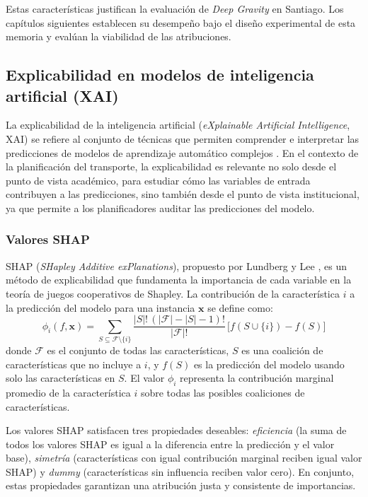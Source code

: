 Estas características justifican la evaluación de \textit{Deep Gravity} en Santiago. Los capítulos siguientes establecen su desempeño bajo el diseño experimental de esta memoria y evalúan la viabilidad de las atribuciones.

\subsection{Explicabilidad en modelos de inteligencia artificial (XAI)}

La explicabilidad de la inteligencia artificial (\textit{eXplainable Artificial Intelligence}, XAI) se refiere al conjunto de técnicas que permiten comprender e interpretar las predicciones de modelos de aprendizaje automático complejos \cite{lundberg2017shap}. En el contexto de la planificación del transporte, la explicabilidad es relevante no solo desde el punto de vista académico, para estudiar cómo las variables de entrada contribuyen a las predicciones, sino también desde el punto de vista institucional, ya que permite a los planificadores auditar las predicciones del modelo.

\subsubsection{Valores SHAP}

SHAP (\textit{SHapley Additive exPlanations}), propuesto por Lundberg y Lee \cite{lundberg2017shap}, es un método de explicabilidad que fundamenta la importancia de cada variable en la teoría de juegos cooperativos de Shapley. La contribución de la característica $i$ a la predicción del modelo para una instancia $\mathbf{x}$ se define como:
\begin{equation}
    \phi_i(f, \mathbf{x}) = \sum_{S \subseteq \mathcal{F} \setminus \{i\}} \frac{|S|!\,(|\mathcal{F}|-|S|-1)!}{|\mathcal{F}|!}\,\bigl[f(S \cup \{i\}) - f(S)\bigr]
    \label{eq:shap}
\end{equation}
donde $\mathcal{F}$ es el conjunto de todas las características, $S$ es una coalición de características que no incluye a $i$, y $f(S)$ es la predicción del modelo usando solo las características en $S$. El valor $\phi_i$ representa la contribución marginal promedio de la característica $i$ sobre todas las posibles coaliciones de características.

Los valores SHAP satisfacen tres propiedades deseables: \textit{eficiencia} (la suma de todos los valores SHAP es igual a la diferencia entre la predicción y el valor base), \textit{simetría} (características con igual contribución marginal reciben igual valor SHAP) y \textit{dummy} (características sin influencia reciben valor cero). En conjunto, estas propiedades garantizan una atribución justa y consistente de importancias.

